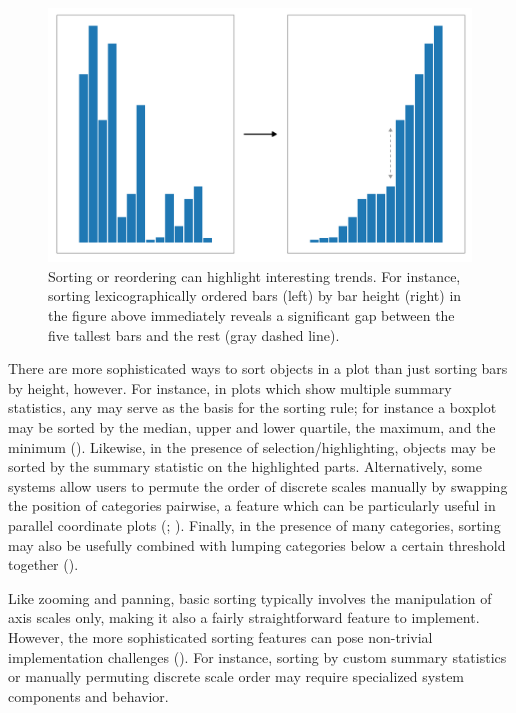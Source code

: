 \documentclass[
]{book}
\begin{document}
\begin{figure}

{\centering \includegraphics[width=20.83in]{./figures/sorting} 

}

\caption{Sorting or reordering can highlight interesting trends. For instance, sorting lexicographically ordered bars (left) by bar height (right) in the figure above immediately reveals a significant gap between the five tallest bars and the rest (gray dashed line).}\label{fig:sorting}
\end{figure}

There are more sophisticated ways to sort objects in a plot than just sorting bars by height, however. For instance, in plots which show multiple summary statistics, any may serve as the basis for the sorting rule; for instance a boxplot may be sorted by the median, upper and lower quartile, the maximum, and the minimum (). Likewise, in the presence of selection/highlighting, objects may be sorted by the summary statistic on the highlighted parts. Alternatively, some systems allow users to permute the order of discrete scales manually by swapping the position of categories pairwise, a feature which can be particularly useful in parallel coordinate plots (; ). Finally, in the presence of many categories, sorting may also be usefully combined with lumping categories below a certain threshold together ().

Like zooming and panning, basic sorting typically involves the manipulation of axis scales only, making it also a fairly straightforward feature to implement. However, the more sophisticated sorting features can pose non-trivial implementation challenges (). For instance, sorting by custom summary statistics or manually permuting discrete scale order may require specialized system components and behavior.
\end{document}
